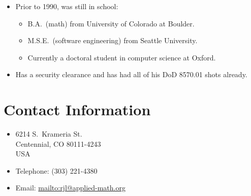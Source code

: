 \documentclass[12pt,letterpaper]{article}
\begin{document}
\begin{itemize}
	\item Prior to 1990, was still in school:
		\begin{itemize}
			\item B.A.\ (math) from University of Colorado at Boulder.
			\item M.S.E.\ (software engineering) from Seattle University.
			\item Currently a doctoral student in computer science at Oxford.
		\end{itemize}

	\item Has a security clearance and has had all of his DoD 8570.01 shots already.
\end{itemize}

\section*{Contact Information}

\begin{itemize}
	\item 6214 S.\ Krameria St. \\
		Centennial, CO 80111-4243 \\
		USA

	\item Telephone: (303) 221-4380

	\item Email: \url{mailto:rjl@applied-math.org}
\end{itemize}

\vfill{}
\end{document}
